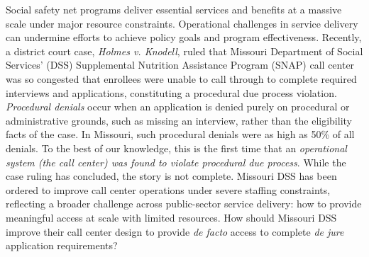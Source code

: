\documentclass[manuscript,screen,authorversion]{acmart}
\begin{document}
Social safety net programs deliver essential services and benefits at a massive scale under major resource constraints. Operational challenges in service delivery can undermine efforts to achieve policy goals and program effectiveness. Recently, a district court case, \textit{Holmes v. Knodell}, ruled that Missouri Department of Social Services’ (DSS) Supplemental Nutrition Assistance Program (SNAP) call center was so congested that enrollees were unable to call through to complete required interviews and applications, constituting a procedural due process violation.
\textit{Procedural denials} occur when an application is denied purely on procedural or administrative grounds, such as missing an interview, rather than the eligibility facts of the case. In Missouri, such procedural denials were as high as 50\% of all denials. %
To the best of our knowledge, this is the first time that an \textit{operational system (the call center) was found to violate procedural due process}. While the case ruling has concluded, the story is not complete. Missouri DSS has been ordered to improve call center operations under severe staffing constraints, reflecting a broader challenge across public-sector service delivery: how to provide meaningful access at scale with limited resources. How should Missouri DSS improve their call center design to provide \textit{de facto} access to complete \textit{de jure} application requirements? 



\end{document}
